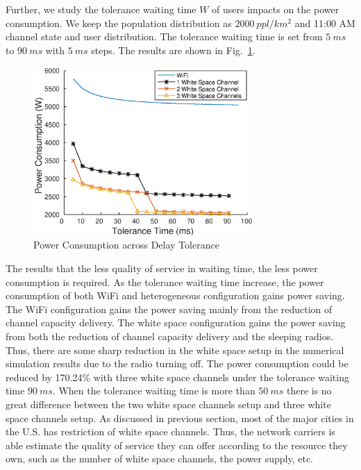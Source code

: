 Further, we study the tolerance waiting time $W$ of users impacts on the power consumption. 
We keep the population distribution as $2000\ ppl/km^2$ and 11:00 AM channel state and 
user distribution.
The tolerance waiting time is set from $5\ ms$  to $90\ ms$ with $5\ ms$ steps. The results 
are shown in Fig.~\ref{fig:delayvary}.
 
\begin{figure}[hpt]
\vspace{-0.0in}
\centering
\includegraphics[width=84mm]{figures/delay_vary}
\vspace{-0.1in}
\caption{Power Consumption across Delay Tolerance}
\label{fig:delayvary}
\vspace{-0.1in}
\end{figure}

The results that the less quality of service in waiting time, the less power consumption is required.
As the tolerance waiting time increase, the power consumption of both WiFi and heterogeneous configuration 
gains power saving. The WiFi configuration gains the power saving mainly from the reduction of channel 
capacity delivery. The white space configuration gains the power saving from both the reduction of channel 
capacity delivery and the sleeping radios. Thus, there are some sharp reduction in the white space setup 
in the numerical simulation results due to the radio turning off.
The power consumption could be reduced by 170.24\% with three white space channels under the tolerance waiting 
time $90\ ms$.
When the tolerance waiting time is more than $50\ ms$ there is no great difference between the two white space 
channels setup and three white space channels setup. 
As discussed in previous section, most of the major cities in the U.S. has restriction of white space channels.
Thus, the network carriers is able estimate the quality of service they can offer according to the resource they 
own, such as the number of white space channels, the power supply, etc.



